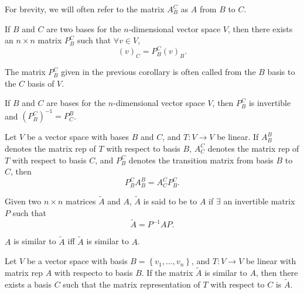 For brevity, we will often refer to the matrix $A^{C}_{B}$ as $A$ from $B$ to $C$.

\begin{corollary}
  If $B$ and $C$ are two bases for the $n$-dimensional vector space $V$, then there exists an $n \times n$ matrix $P^{C}_{B}$ such that $\forall v \in V$,
  \begin{equation*}
    (v)_{C} = P^{C}_{B} (v)_{B}.
  \end{equation*}
\end{corollary}

\begin{definition}
  The matrix $P^{C}_{B}$ given in the previous corollary is often called  from the $B$ basis to the $C$ basis of $V$.
\end{definition}

\begin{theorem}
  If $B$ and $C$ are bases for the $n$-dimensional vector space $V$, then $P^{C}_{B}$ is invertible and $(P^{C}_{B})^{-1} = P^B_C$.
\end{theorem}

\begin{theorem}
  Let $V$ be a vector space with bases $B$ and $C$, and $T : V \to V$ be linear. If $A^{B}_B$ denotes the matrix rep of $T$ with respect to basis $B$,
  $A^{C}_{C}$ denotes the matrix rep of $T$ with respect to basis $C$, and $P^{C}_{B}$ denotes the transition matrix from basis $B$ to $C$, then
  \begin{equation*}
    P^{C}_{B} A^{B}_{B} = A^{C}_{C} P^{C}_{B}.
  \end{equation*}
\end{theorem}

\begin{definition}
  Given two $n \times n$ matrices $\tilde{A}$ and $A$, $\tilde{A}$ is said to be  to $A$ if $\exists$ an invertible matrix $P$ such that
  \begin{equation*}
    \tilde{A} = P^{-1} AP.
  \end{equation*}
\end{definition}

$A$ is similar to $\tilde{A}$ iff $\tilde{A}$ is similar to $A$.

\begin{theorem}
  Let $V$ be a vector space with basis $B = \left\{v_{1}, \dots, v_{n}\right\}$, and $T : V \to V$ be linear with matrix rep $A$ with respecto to basis $B$.
  If the matrix $\tilde{A}$ is similar to $A$, then there exists a basis $C$ such that the matrix representation of $T$ with respect to $C$ is $\tilde{A}$.
\end{theorem}

